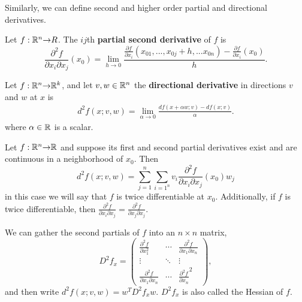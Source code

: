 Similarly, we can define second and higher order partial and
directional derivatives.
\begin{definition}
  Let $f:\mathbb{R}^n {\rightarrow} R$. The $ij$th \textbf{partial second derivative} of $f$
  is 
  \[ \frac{\partial^2 f}{\partial x_i \partial x_j} (x_0) = \lim_{h \to 0}
  \frac{\frac{\partial f}{\partial x_i} (x_{01},...,x_{0j}+h, ... x_{0n}) -
    \frac{\partial f}{\partial x_i}(x_0) }{h}. \] 
\end{definition}
\begin{definition}
  Let $f: \mathbb{R}^n {\rightarrow} \mathbb{R}^k$, and let $v, w \in \mathbb{R}^n$ the \textbf{directional
    derivative} in directions $v$ and $w$ at $x$ is
  \begin{align*}
    d^2f(x;v,w) = \lim_{\alpha \to 0} \frac{df(x + \alpha w;v) - df(x;v)}{\alpha}.
  \end{align*}  
  where $\alpha \in \mathbb{R}$ is a scalar.
\end{definition}
\begin{theorem}\label{thm:pddiff2}
  Let $f:\mathbb{R}^n {\rightarrow} \mathbb{R}$ and suppose its first and second partial
  derivatives exist and are continuous in a neighborhood of
  $x_0$. Then
  \[ d^2f(x;v,w) = \sum_{j=1}^n \sum_{i=1^n} v_i \frac{\partial^2
    f}{\partial x_i \partial x_j}
  (x_0) w_j \]
  in this case we will say that $f$ is twice differentiable at $x_0$. 
  Additionally, if $f$ is twice differentiable, then $\frac{\partial^2
    f}{\partial x_i \partial x_j} = \frac{\partial^2
    f}{\partial x_j \partial x_j}$.
\end{theorem}
We can gather the second partials of $f$ into an $n \times n$ matrix,
\[ D^2 f_{x} = \begin{pmatrix} \frac{\partial ^2 f}{\partial x_1^2}
  & \cdots & \frac{\partial^2 f }{\partial x_1\partial x_n} \\
  \vdots & \ddots & \vdots \\
  \frac{\partial^2 f}{\partial x_1\partial x_n} & \cdots &
  \frac{\partial^2 f}{\partial x_n}^2 \end{pmatrix},
\]
and then write $d^2f(x;v,w) = w^T D^2 f_x w$. $D^2 f_x$ is also called
the Hessian of $f$.

\clearpage




